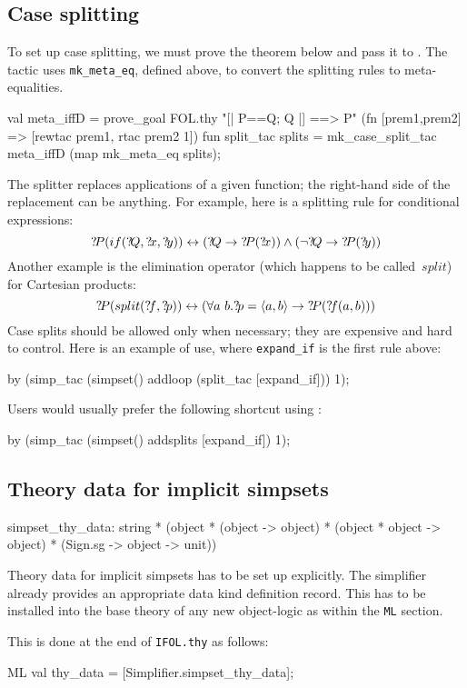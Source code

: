 \subsection{Case splitting}
To set up case splitting, we must prove the theorem below and pass it to
.  The tactic  uses
{\tt mk_meta_eq}, defined above, to convert the splitting rules to
meta-equalities.
\begin{ttbox}
val meta_iffD = 
    prove_goal FOL.thy "[| P==Q; Q |] ==> P"
        (fn [prem1,prem2] => [rewtac prem1, rtac prem2 1])
\ttbreak
fun split_tac splits =
    mk_case_split_tac meta_iffD (map mk_meta_eq splits);
\end{ttbox}
%
The splitter replaces applications of a given function; the right-hand side
of the replacement can be anything.  For example, here is a splitting rule
for conditional expressions:
\[ \Var{P}(if(\Var{Q},\Var{x},\Var{y})) \bimp (\Var{Q} \imp \Var{P}(\Var{x}))
\conj (\lnot\Var{Q} \imp \Var{P}(\Var{y})) 
\] 
Another example is the elimination operator (which happens to be
called~$split$) for Cartesian products:
\[ {?\!P}(split({?\!f},{?\!p})) \leftrightarrow (\forall a~b. {?\!p} =
\langle a,b\rangle \rightarrow {?\!P}({?\!f}(a,b))) 
\] 
Case splits should be allowed only when necessary; they are expensive
and hard to control.  Here is an example of use, where {\tt expand_if}
is the first rule above:
\begin{ttbox}
by (simp_tac (simpset() addloop (split_tac [expand_if])) 1);
\end{ttbox}
Users would usually prefer the following shortcut using
:
\begin{ttbox}
by (simp_tac (simpset() addsplits [expand_if]) 1);
\end{ttbox}


\subsection{Theory data for implicit simpsets}
\begin{ttbox}
simpset_thy_data: string * (object * (object -> object) *
    (object * object -> object) * (Sign.sg -> object -> unit))
\end{ttbox}

Theory data for implicit simpsets has to be set up explicitly.  The
simplifier already provides an appropriate data kind definition
record.  This has to be installed into the base theory of any new
object-logic as  within the \texttt{ML} section.

This is done at the end of \texttt{IFOL.thy} as follows:
\begin{ttbox}
ML val thy_data = [Simplifier.simpset_thy_data];
\end{ttbox}


